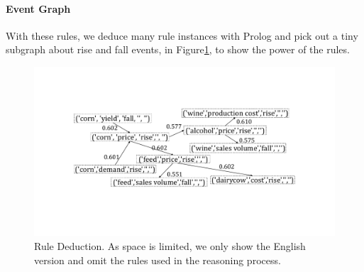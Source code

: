 \paragraph{Event Graph}
With these rules, we deduce many rule instances with Prolog and pick out a tiny subgraph about rise and fall events, in Figure\ref{fig:rule_instantiation_graph}, to show the power of the rules. 
	
\begin{figure}[htbp]
\begin{center}
	\includegraphics[width=0.9\columnwidth]{figures/instantiation_graph}
\end{center}
\caption{Rule Deduction. As space is limited, we only show the English version and omit the rules used in the reasoning process.}
\label{fig:rule_instantiation_graph}
\end{figure}

